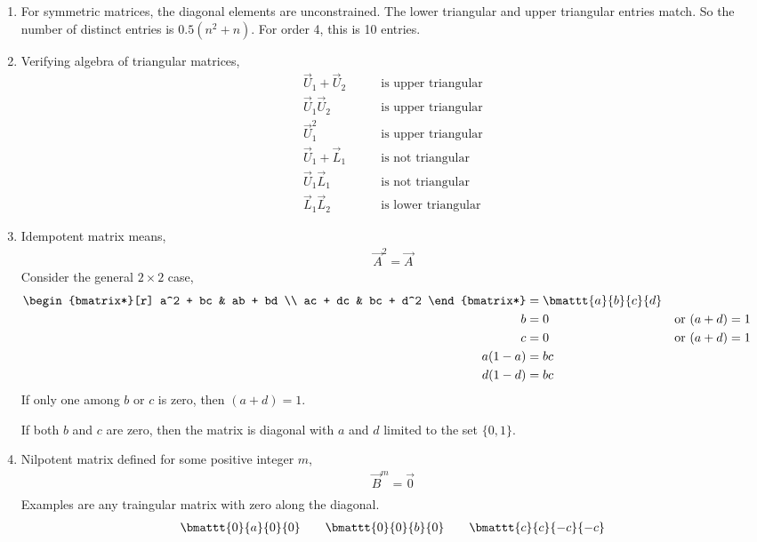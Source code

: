 \begin{enumerate}
\item For symmetric matrices, the diagonal elements are unconstrained. The
lower triangular and upper triangular entries match. So the number of distinct
entries is $ 0.5(n^2 + n) $. For order 4, this is 10 entries.

\item Verifying algebra of triangular matrices,
\begin{align}
    \vec{U}_1 + \vec{U}_2 & \qquad  \text{is upper triangular} \\
    \vec{U}_1\vec{U}_2    & \qquad  \text{is upper triangular} \\
    \vec{U}_1^2           & \qquad  \text{is upper triangular} \\
    \vec{U}_1 + \vec{L}_1 & \qquad  \text{is not triangular}   \\
    \vec{U}_1 \vec{L}_1   & \qquad  \text{is not triangular}   \\
    \vec{L}_1 \vec{L}_2   & \qquad  \text{is lower triangular}
\end{align}

\item Idempotent matrix means,
\begin{align}
    \vec{A}^2 = \vec{A}
\end{align}
Consider the general $ 2 \times 2 $ case,
\begin{align}
    \begin{bmatrix*}[r]
        a^2 + bc & ab + bd \\
        ac + dc & bc + d^2
    \end{bmatrix*} & = \bmattt{a}{b}{c}{d}                                  \\
    b                     & = 0                   & \text{or}\  & (a+d) = 1 \\
    c                     & = 0                   & \text{or}\  & (a+d) = 1 \\
    a(1 - a)              & = bc                                            \\
    d(1 - d)              & = bc                                            \\
\end{align}
If only one among $ b $ or $ c $ is zero, then $ (a + d) = 1 $. \par
If both $ b $ and $ c $ are zero, then the matrix is diagonal with $ a $ and
$ d $ limited to the set $ \{0, 1\} $.

\item Nilpotent matrix defined for some positive integer $ m $,
\begin{align}
    \vec{B}^m = \vec{0} \\
\end{align}
Examples are any traingular matrix with zero along the diagonal.
\begin{align}
    \bmattt{0}{a}{0}{0} \qquad \bmattt{0}{0}{b}{0} \qquad
    \bmattt{c}{c}{-c}{-c}
\end{align}


\end{enumerate}
